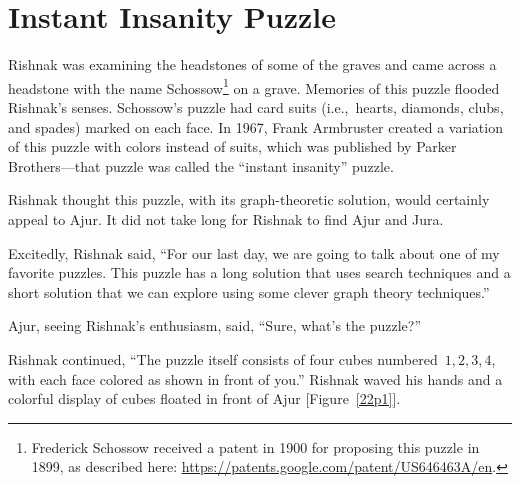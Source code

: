 \chapter{Instant Insanity Puzzle}

Rishnak was examining the headstones of some of the graves and came across a headstone with the name Schossow\footnote{Frederick Schossow received a patent in 1900 for proposing this puzzle in 1899, as described here: \url{https://patents.google.com/patent/US646463A/en}.} on a grave. Memories of this puzzle flooded Rishnak's senses. Schossow's puzzle had card suits (i.e.,~hearts, diamonds, clubs, and spades) marked on each face. In 1967, Frank Armbruster created a variation of this puzzle with colors instead of suits, which was published by Parker Brothers---that puzzle was called the ``instant insanity'' puzzle.

Rishnak thought this puzzle, with its graph-theoretic solution, would certainly appeal to Ajur. It did not take long for Rishnak to find Ajur and Jura.

Excitedly, Rishnak said, ``For our last day, we are going to talk about one of my favorite puzzles. This puzzle has a long solution that uses search techniques and a short solution that we can explore using some clever graph theory techniques.''

Ajur, seeing Rishnak's enthusiasm, said, ``Sure, what's the puzzle?''

Rishnak continued, ``The puzzle itself consists of four cubes numbered~$1,2,3,4$, with each face colored as shown in front of you.'' Rishnak waved his hands and a colorful display of cubes floated in front of Ajur [Figure~\ref{22p1}].

